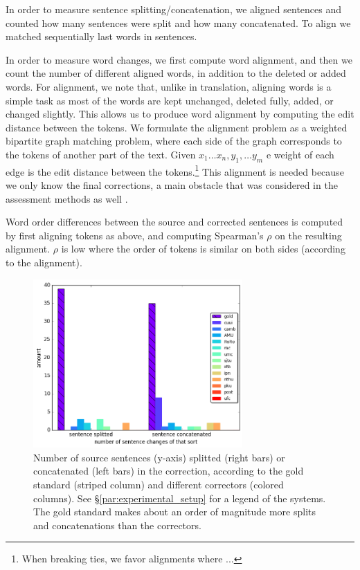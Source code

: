 \documentclass[english]{article}
\begin{document}
In order to measure sentence splitting/concatenation, we aligned sentences and counted how
many sentences were split and how many concatenated. To align we matched sequentially last
words in sentences.

In order to measure word changes, we first compute word alignment,
and then we count the number of different aligned words,
in addition to the deleted or added words.
For alignment, we note that, unlike in translation,
aligning words is a simple task as most of the words are kept unchanged,
deleted fully, added, or changed slightly. This allows us to
produce word alignment by computing the edit distance between the tokens.
We formulate the alignment problem as a weighted bipartite graph matching problem,
where each side of the graph corresponds to the tokens of another part of the text.
Given $x_1\ldots x_n,y_1,\ldots y_m$ e weight of each edge is the edit distance between the tokens.\footnote{When breaking ties, we favor alignments where ...}
This alignment is needed because we only know the final corrections,
a main obstacle that was considered in the assessment methods as well
\cite{dahlmeier2012better}.

Word order differences between the source and corrected sentences is
computed by first aligning tokens as above, and computing Spearman's $\rho$ on the resulting alignment.
$\rho$ is low where the order of tokens is similar on both sides (according to the alignment).


\begin{figure}
	\includegraphics[width = 8cm]{aligned}
	\caption{Number of source sentences (y-axis) splitted (right bars) or concatenated (left bars) in the correction,
          according to
          the gold standard (striped column) and different correctors (colored columns). See \S\ref{par:experimental_setup} for a legend
          of the systems. The gold standard makes about an order of magnitude more splits and
          concatenations than the correctors.}
	\label{fig:split}
\end{figure}
\end{document}
